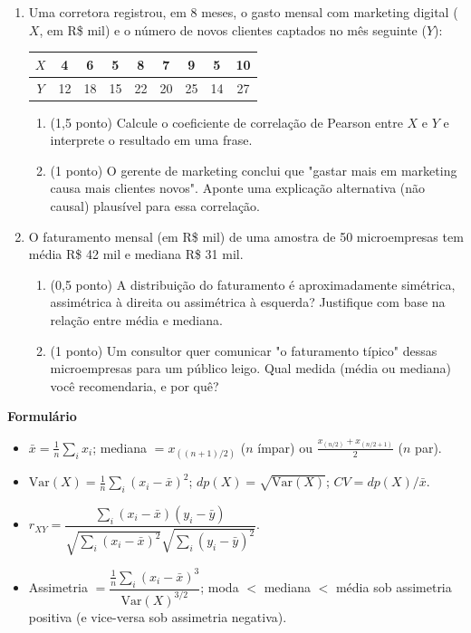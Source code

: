 \documentclass[11pt]{article}
\begin{document}
\begin{enumerate}
\item Uma corretora registrou, em 8 meses, o gasto mensal com marketing digital ($X$, em R\$ mil)
e o número de novos clientes captados no mês seguinte ($Y$):

\begin{center}
\begin{tabular}{c|cccccccc}
\toprule
$X$ & 4 & 6 & 5 & 8 & 7 & 9 & 5 & 10 \\
\midrule
$Y$ & 12 & 18 & 15 & 22 & 20 & 25 & 14 & 27 \\
\bottomrule
\end{tabular}
\end{center}

\begin{enumerate}
  \item (1,5 ponto) Calcule o coeficiente de correlação de Pearson entre $X$ e $Y$ e interprete o
    resultado em uma frase.
  \item (1 ponto) O gerente de marketing conclui que "gastar mais em marketing causa mais clientes
    novos". Aponte uma explicação alternativa (não causal) plausível para essa correlação.
\end{enumerate}

\item O faturamento mensal (em R\$ mil) de uma amostra de 50 microempresas tem média R\$ 42 mil e
mediana R\$ 31 mil.

\begin{enumerate}
  \item (0,5 ponto) A distribuição do faturamento é aproximadamente simétrica, assimétrica à
    direita ou assimétrica à esquerda? Justifique com base na relação entre média e mediana.
  \item (1 ponto) Um consultor quer comunicar "o faturamento típico" dessas microempresas para um
    público leigo. Qual medida (média ou mediana) você recomendaria, e por quê?
\end{enumerate}

\end{enumerate}

\vspace{1cm}
\begin{center}
\Large\textbf{Formulário}
\end{center}
\begin{small}
\begin{itemize}
  \item $\bar x = \frac1n\sum_i x_i$; mediana $=x_{((n+1)/2)}$ ($n$ ímpar) ou
    $\frac{x_{(n/2)}+x_{(n/2+1)}}{2}$ ($n$ par).
  \item $\mathrm{Var}(X)=\frac1n\sum_i(x_i-\bar x)^2$; $dp(X)=\sqrt{\mathrm{Var}(X)}$;
    $CV=dp(X)/\bar x$.
  \item $r_{XY} = \dfrac{\sum_i (x_i-\bar x)(y_i-\bar y)}{\sqrt{\sum_i(x_i-\bar x)^2}\sqrt{\sum_i(y_i-\bar y)^2}}$.
  \item Assimetria $=\dfrac{\frac1n\sum_i(x_i-\bar x)^3}{\mathrm{Var}(X)^{3/2}}$; moda $<$ mediana
    $<$ média sob assimetria positiva (e vice-versa sob assimetria negativa).
\end{itemize}
\end{small}
\end{document}
